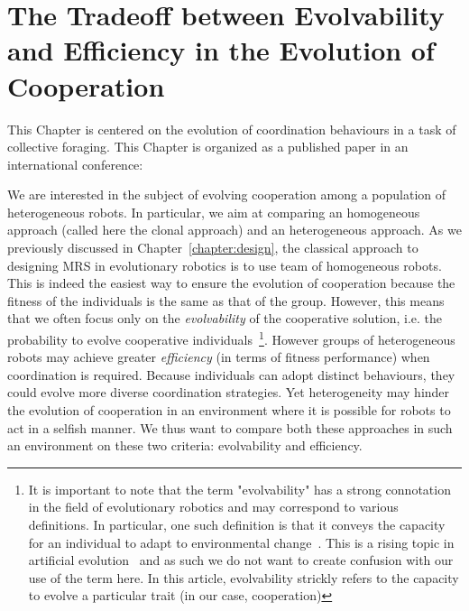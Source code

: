 \chapter{The Tradeoff between Evolvability and Efficiency in the Evolution of Cooperation}
\label{chapter:C2_article1}

\setcounter{secnumdepth}{0}
\setcounter{minitocdepth}{1}
\minitoc[n] %

This Chapter is centered on the evolution of coordination behaviours in a task of collective foraging. This Chapter is organized as a published paper in an international conference:

\begin{quote}
\end{quote}


We are interested in the subject of evolving cooperation among a population of heterogeneous robots. In particular, we aim at comparing an homogeneous approach (called here the clonal approach) and an heterogeneous approach. As we previously discussed in Chapter~\ref{chapter:design}, the classical approach to designing MRS in evolutionary robotics is to use team of homogeneous robots. This is indeed the easiest way to ensure the evolution of cooperation because the fitness of the individuals is the same as that of the group. However, this means that we often focus only on the \emph{evolvability} of the cooperative solution, i.e. the probability to evolve cooperative individuals~\footnote{It is important to note that the term "evolvability" has a strong connotation in the field of evolutionary robotics and may correspond to various definitions. In particular, one such definition is that it conveys the capacity for an individual to adapt to environmental change~\parencite{Wagner1996}. This is a rising topic in artificial evolution~\parencite{Banzhaf2006, Lehman2013, Doncieux2015a, Taylor2016} and as such we do not want to create confusion with our use of the term here. In this article, evolvability strickly refers to the capacity to evolve a particular trait (in our case, cooperation)}. However groups of heterogeneous robots may achieve greater \emph{efficiency} (in terms of fitness performance) when coordination is required. Because individuals can adopt distinct behaviours, they could evolve more diverse coordination strategies. Yet heterogeneity may hinder the evolution of cooperation in an environment where it is possible for robots to act in a selfish manner. We thus want to compare both these approaches in such an environment on these two criteria: evolvability and efficiency.

